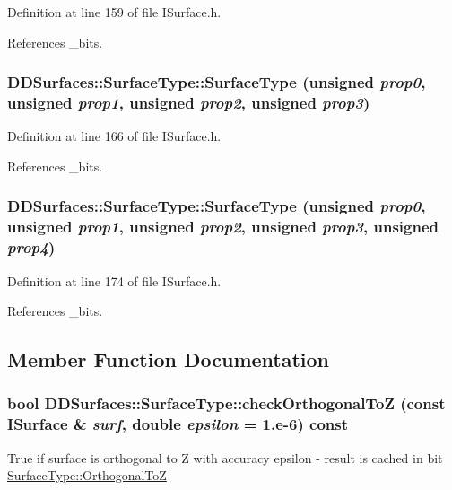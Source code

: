 Definition at line 159 of file ISurface.h.

References \_\-bits.\hypertarget{class_d_d_surfaces_1_1_surface_type_a14d8c8c9ca24104930ff64b27774b916}{
\subsubsection[{SurfaceType}]{\setlength{\rightskip}{0pt plus 5cm}DDSurfaces::SurfaceType::SurfaceType (unsigned {\em prop0}, \/  unsigned {\em prop1}, \/  unsigned {\em prop2}, \/  unsigned {\em prop3})}}
\label{class_d_d_surfaces_1_1_surface_type_a14d8c8c9ca24104930ff64b27774b916}


Definition at line 166 of file ISurface.h.

References \_\-bits.\hypertarget{class_d_d_surfaces_1_1_surface_type_ac5fb5d83f865a805ea0fdbe799e50e5b}{
\subsubsection[{SurfaceType}]{\setlength{\rightskip}{0pt plus 5cm}DDSurfaces::SurfaceType::SurfaceType (unsigned {\em prop0}, \/  unsigned {\em prop1}, \/  unsigned {\em prop2}, \/  unsigned {\em prop3}, \/  unsigned {\em prop4})}}
\label{class_d_d_surfaces_1_1_surface_type_ac5fb5d83f865a805ea0fdbe799e50e5b}


Definition at line 174 of file ISurface.h.

References \_\-bits.

\subsection{Member Function Documentation}
\hypertarget{class_d_d_surfaces_1_1_surface_type_a9c98b2758bce1af96aa487bb0e131f6b}{
\subsubsection[{checkOrthogonalToZ}]{\setlength{\rightskip}{0pt plus 5cm}bool DDSurfaces::SurfaceType::checkOrthogonalToZ (const {\bf ISurface} \& {\em surf}, \/  double {\em epsilon} = {\ttfamily 1.e-\/6}) const}}
\label{class_d_d_surfaces_1_1_surface_type_a9c98b2758bce1af96aa487bb0e131f6b}
True if surface is orthogonal to Z with accuracy epsilon -\/ result is cached in bit \hyperlink{class_d_d_surfaces_1_1_surface_type_a2e946294c5368a34e227be2b17e73051ac72842b667410b4ce6e55451902460ee}{SurfaceType::OrthogonalToZ} 

